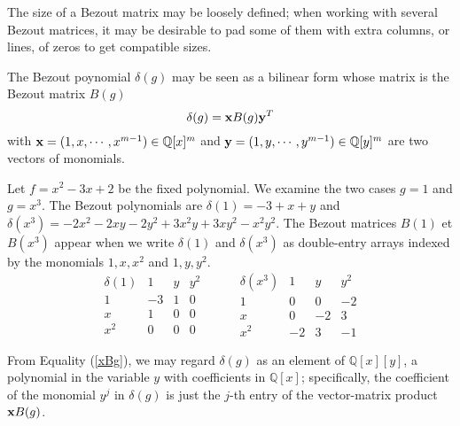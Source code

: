 \documentclass{standalone}
\begin{document}
\begin{rem}
\begin{rem}
The size of a Bezout matrix may be loosely defined; when working with several Bezout matrices, it may be desirable to pad some of them with extra columns, or lines, of zeros to get compatible sizes.
\end{rem}
\begin{rem}
The Bezout poynomial $\delta(g)$ may be seen as a bilinear form whose matrix is the Bezout matrix $B(g)$
\begin{equation}
	\label{xBg}
	\delta(g) = \bold{x} B(g) \bold{y}^T
\end{equation}
with $\bold{x} = (1, x,\cdots, x^{m-1}) \in \mathbb{Q}[x]^m$ and $\bold{y} = (1, y,\cdots, y^{m-1}) \in \mathbb{Q}[y]^m$ are two vectors of monomials.
\end{rem}

\begin{exmp}
\label{exmp_1}
Let $f = x^2 - 3x + 2$ be the fixed polynomial. We examine the two cases $g=1$ and $g = x^3$. The Bezout polynomials are $\delta(1) = -3 + x + y$ and $\delta(x^3) = -2x^2 - 2xy -2y^2 + 3x^2y + 3xy^2 -x^2y^2$. The Bezout matrices $B(1)$ et $B(x^3)$ appear when we write  $\delta(1)$ and  $\delta(x^3)$ as double-entry arrays indexed by the monomials $1, x, x^2$ and $1, y, y^2$.
$$
\begin{array}{c|ccc}
\delta(1) & 1 & y & y^2\\
\hline
1 & -3 & 1 & 0\\
x & 1 & 0 & 0\\
x^2 & 0 & 0 & 0
\end{array}
\hspace{1cm}
\begin{array}{c|ccc}
\delta(x^3) & 1 & y & y^2\\
\hline
1 & 0 & 0 & -2\\
x & 0 & -2 & 3\\
x^2 & -2 & 3 & -1
\end{array}
$$
\end{exmp}

From Equality (\ref{xBg}), we may regard $\delta(g)$ as an element of $\mathbb{Q}[x][y]$, a polynomial in the variable $y$ with coefficients in $\mathbb{Q}[x]$; specifically, the coefficient of the monomial $y^j$ in $\delta(g)$ is just the $j$-th entry of the vector-matrix product $\bold{x} B(g)$.





\end{rem}
\end{document}
